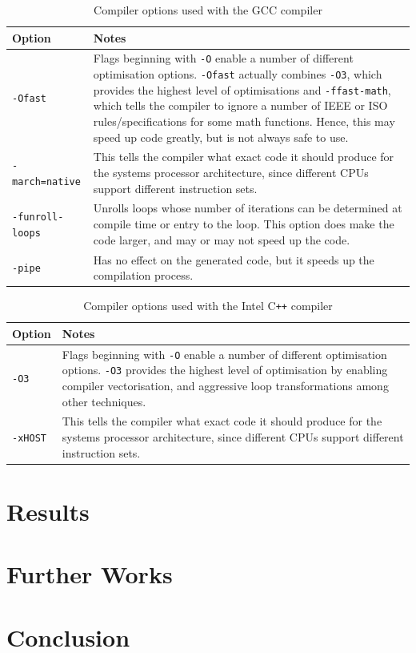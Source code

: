 \documentclass[11pt]{article}
\theoremstyle{theorem}
\theoremstyle{remark}
\theoremstyle{plain}
\theoremstyle{definition}
\begin{document}
\begin{table}[h!]
\centering
	\begin{tabular}{ |p{} | p{} |}
    	\hline
	\textbf{Option} & \textbf{Notes} \\
   	\hline
	\texttt{-Ofast} & Flags beginning with \texttt{-O} enable a number of different optimisation options. \texttt{-Ofast} actually combines  \texttt{-O3}, which provides the highest level of optimisations and \texttt{-ffast-math}, which tells the compiler to ignore a number of IEEE or ISO rules/specifications for some math functions. Hence, this may speed up code greatly, but is not always safe to use.\\
	\hline
	\texttt{-march=native} & This tells the compiler what exact code it should produce for the systems processor architecture, since different CPUs support different instruction sets.\\
	\hline
	\texttt{-funroll-loops} & Unrolls loops whose number of iterations can be determined at compile time or entry to the loop. This option does make the code larger, and may or may not speed up the code.\\
	\hline
	\texttt{-pipe} & Has no effect on the generated code, but it speeds up the compilation process.\\
	\hline
	 \end{tabular}
\caption{Compiler options used with the GCC compiler} \label{tab:gcc_compiler_flags}
\end{table}

\begin{table}[h!]
\centering
	\begin{tabular}{ |p{} | p{} |}
    	\hline
	\textbf{Option} & \textbf{Notes} \\
   	\hline
	\texttt{-O3} & Flags beginning with \texttt{-O} enable a number of different optimisation options. \texttt{-O3} provides the highest level of optimisation by enabling compiler vectorisation, and aggressive loop transformations among other techniques.\\
	\hline
	\texttt{-xHOST} & This tells the compiler what exact code it should produce for the systems processor architecture, since different CPUs support different instruction sets.\\
	\hline
	 \end{tabular}
\caption{Compiler options used with the Intel C\texttt{++} compiler} \label{tab:intel_compiler_flags}
\end{table}

\section{Results}
\section{Further Works}
\section{Conclusion}



\end{document}

